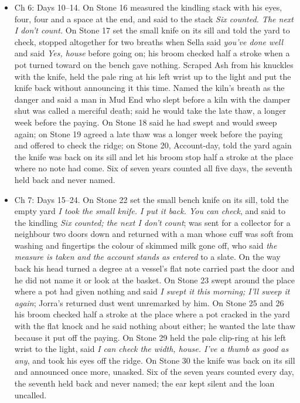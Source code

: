 \documentclass{design/chronicle}
\begin{document}
{\begin{itemize}[leftmargin=1.4em,itemsep=1pt,topsep=3pt,parsep=0pt]
\item Ch 6: Days 10--14. On Stone 16 measured the kindling stack with his eyes, four, four and a space at the end, and said to the stack \emph{Six counted. The next I don’t count.} On Stone 17 set the small knife on its sill and told the yard to check, stopped altogether for two breaths when Sella said \emph{you’ve done well} and said \emph{Yes, house} before going on; his broom checked half a stroke when a pot turned toward on the bench gave nothing. Scraped Ash from his knuckles with the knife, held the pale ring at his left wrist up to the light and put the knife back without announcing it this time. Named the kiln’s breath as the danger and said a man in Mud End who slept before a kiln with the damper shut was called a merciful death; said he would take the late thaw, a longer week before the paying. On Stone 18 said he had swept and would sweep again; on Stone 19 agreed a late thaw was a longer week before the paying and offered to check the ridge; on Stone 20, Account-day, told the yard again the knife was back on its sill and let his broom stop half a stroke at the place where no note had come. Six of seven years counted all five days, the seventh held back and never named.

\end{itemize}

\begin{itemize}[leftmargin=1.4em,itemsep=1pt,topsep=3pt,parsep=0pt]

\item Ch 7: Days 15--24. On Stone 22 set the small bench knife on its sill, told the empty yard \emph{I took the small knife. I put it back. You can check}, and said to the kindling \emph{Six counted; the next I don’t count}; was sent for a collector for a neighbour two doors down and returned with a man whose cuff was soft from washing and fingertips the colour of skimmed milk gone off, who said \emph{the measure is taken and the account stands as entered} to a slate. On the way back his head turned a degree at a vessel’s flat note carried past the door and he did not name it or look at the basket. On Stone 23 swept around the place where a pot had given nothing and said \emph{I swept it this morning; I’ll sweep it again}; Jorra’s returned dust went unremarked by him. On Stone 25 and 26 his broom checked half a stroke at the place where a pot cracked in the yard with the flat knock and he said nothing about either; he wanted the late thaw because it put off the paying. On Stone 29 held the pale clip-ring at his left wrist to the light, said \emph{I can check the width, house. I’ve a thumb as good as any}, and took his eyes off the ridge. On Stone 30 the knife was back on its sill and announced once more, unasked. Six of the seven years counted every day, the seventh held back and never named; the ear kept silent and the loan uncalled.


\end{itemize}}
\end{document}

